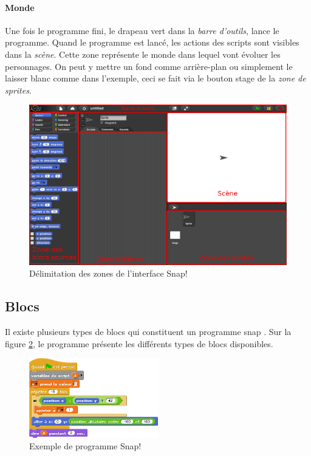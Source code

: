 \paragraph{Monde}
Une fois le programme fini, le drapeau vert dans la \textit{barre d'outils}, lance le programme. Quand le programme est lancé, les actions des \glspl{script} sont visibles dans la \textit{scène}. Cette zone représente le monde dans lequel vont évoluer les personnages. On peut y mettre un fond comme arrière-plan ou simplement le laisser blanc comme dans l'exemple, ceci se fait via le bouton stage de la \textit{zone de \glspl{sprite}}.

\begin{figure}
  \begin{center}
  \includegraphics[width=\textwidth]{content/7-solution/2-snap/images/interface}
        \caption{Délimitation des zones de l'interface Snap!}
    \label{fig:snap interface}
  \end{center}
\end{figure}

\subsection{Blocs}
Il existe plusieurs types de \glspl{bloc} qui constituent un programme \gls{snap} \cite{snap-man}. Sur la figure \ref{fig:software-used-script}, le programme présente les différents types de \glspl{bloc} disponibles.
\begin{figure}
  \begin{center}
    \includegraphics[width=0.5\textwidth]{content/5-related_work/images/script}
    \caption{Exemple de programme Snap!}
    \label{fig:software-used-script}
  \end{center}
\end{figure}

